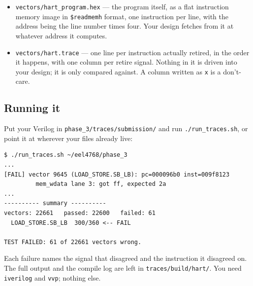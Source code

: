 \documentclass[11pt]{article}
\begin{document}
\begin{itemize}
  \item \texttt{vectors/hart\_program.hex} --- the program itself, as a flat
        instruction memory image in \texttt{\$readmemh} format, one
        instruction per line, with the address being the line number times
        four. Your design fetches from it at whatever address it computes.
  \item \texttt{vectors/hart.trace} --- one line per instruction actually
        retired, in the order it happens, with one column per retire signal.
        Nothing in it is driven into your design; it is only compared
        against. A column written as \texttt{x} is a don't-care.
\end{itemize}

\subsection{Running it}
Put your Verilog in \texttt{phase\_3/traces/submission/} and run
\texttt{./run\_traces.sh}, or point it at wherever your files already live:

\begin{lstlisting}[language={}]
$ ./run_traces.sh ~/eel4768/phase_3
...
[FAIL] vector 9645 (LOAD_STORE.SB_LB): pc=000096b0 inst=009f8123
         mem_wdata lane 3: got ff, expected 2a
...
---------- summary ----------
vectors: 22661   passed: 22600   failed: 61
  LOAD_STORE.SB_LB  300/360 <-- FAIL

TEST FAILED: 61 of 22661 vectors wrong.
\end{lstlisting}

Each failure names the signal that disagreed and the instruction it
disagreed on. The full output and the compile log are left in
\texttt{traces/build/hart/}. You need \texttt{iverilog} and \texttt{vvp};
nothing else.
\end{document}

